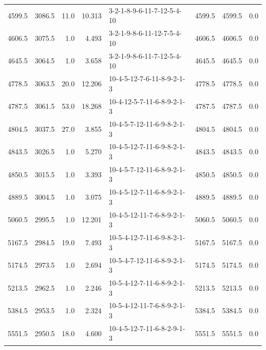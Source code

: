 \begin{tabular}{rrrrlrrr}
 4599.5 &  3086.5 &           11.0 &             10.313 &  3-2-1-8-9-6-11-7-12-5-4-10 &        4599.5 &          4599.5 &       0.0 \\
 4606.5 &  3075.5 &            1.0 &              4.493 &  3-2-1-9-8-6-11-12-7-5-4-10 &        4606.5 &          4606.5 &       0.0 \\
 4645.5 &  3064.5 &            1.0 &              3.658 &  3-2-1-9-8-6-11-7-12-5-4-10 &        4645.5 &          4645.5 &       0.0 \\
 4778.5 &  3063.5 &           20.0 &             12.206 &  10-4-5-12-7-6-11-8-9-2-1-3 &        4778.5 &          4778.5 &       0.0 \\
 4787.5 &  3061.5 &           53.0 &             18.268 &  10-4-12-5-7-11-6-8-9-2-1-3 &        4787.5 &          4787.5 &       0.0 \\
 4804.5 &  3037.5 &           27.0 &              3.855 &  10-4-5-7-12-11-6-9-8-2-1-3 &        4804.5 &          4804.5 &       0.0 \\
 4843.5 &  3026.5 &            1.0 &              5.270 &  10-4-5-12-7-11-6-9-8-2-1-3 &        4843.5 &          4843.5 &       0.0 \\
 4850.5 &  3015.5 &            1.0 &              3.393 &  10-4-5-7-12-11-6-8-9-2-1-3 &        4850.5 &          4850.5 &       0.0 \\
 4889.5 &  3004.5 &            1.0 &              3.075 &  10-4-5-12-7-11-6-8-9-2-1-3 &        4889.5 &          4889.5 &       0.0 \\
 5060.5 &  2995.5 &            1.0 &             12.201 &  10-4-5-12-11-7-6-8-9-2-1-3 &        5060.5 &          5060.5 &       0.0 \\
 5167.5 &  2984.5 &           19.0 &              7.493 &  10-5-4-12-7-11-6-9-8-2-1-3 &        5167.5 &          5167.5 &       0.0 \\
 5174.5 &  2973.5 &            1.0 &              2.694 &  10-5-4-7-12-11-6-8-9-2-1-3 &        5174.5 &          5174.5 &       0.0 \\
 5213.5 &  2962.5 &            1.0 &              2.246 &  10-5-4-12-7-11-6-8-9-2-1-3 &        5213.5 &          5213.5 &       0.0 \\
 5384.5 &  2953.5 &            1.0 &              2.324 &  10-5-4-12-11-7-6-8-9-2-1-3 &        5384.5 &          5384.5 &       0.0 \\
 5551.5 &  2950.5 &           18.0 &              4.600 &  10-4-5-12-7-11-6-8-2-9-1-3 &        5551.5 &          5551.5 &       0.0 \\

\end{tabular}
